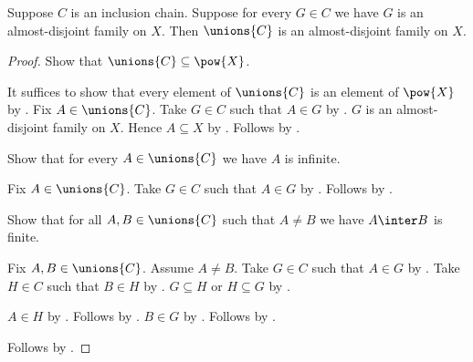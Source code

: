 \begin{theorem}\label{union_of_chain_of_almost_disjoint_families}
    Suppose $C$ is an inclusion chain.
    Suppose for every $G\in C$ we have
        $G$ is an almost-disjoint family on $X$.
    Then $\unions{C}$ is an almost-disjoint family on $X$.
\end{theorem}
\begin{proof}
    Show that $\unions{C}\subseteq\pow{X}$.
    \begin{subproof}
        It suffices to show that every element of $\unions{C}$ is an element
            of $\pow{X}$ by .
        Fix $A\in\unions{C}$.
        Take $G\in C$ such that $A\in G$ by .
        $G$ is an almost-disjoint family on $X$.
        Hence $A\subseteq X$
            by .
        Follows by .
    \end{subproof}
    Show that for every $A\in\unions{C}$ we have $A$ is infinite.
    \begin{subproof}
        Fix $A\in\unions{C}$.
        Take $G\in C$ such that $A\in G$ by .
        Follows by .
    \end{subproof}
    Show that for all $A,B\in\unions{C}$ such that $A\neq B$
        we have $A\inter B$ is finite.
    \begin{subproof}
        Fix $A,B\in\unions{C}$.
        Assume $A\neq B$.
        Take $G\in C$ such that $A\in G$ by .
        Take $H\in C$ such that $B\in H$ by .
        $G\subseteq H$ or $H\subseteq G$ by .
        \begin{byCase}
                $A\in H$ by .
                Follows by
                    .
                $B\in G$ by .
                Follows by
                    .
        \end{byCase}
    \end{subproof}
    Follows by .
\end{proof}

